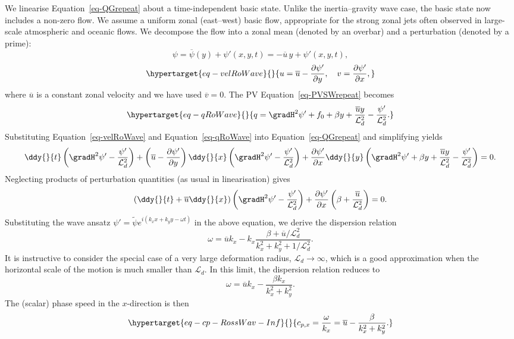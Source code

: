 \documentclass[
  letterpaper,
  twocolumn,
  landscape]{report}
\begin{document}
We linearise Equation~\ref{eq-QGrepeat} about a time-independent basic
state. Unlike the inertia--gravity wave case, the basic state now
includes a non-zero flow. We assume a uniform zonal (east--west) basic
flow, appropriate for the strong zonal jets often observed in
large-scale atmospheric and oceanic flows. We decompose the flow into a
zonal mean (denoted by an overbar) and a perturbation (denoted by a
prime): \[
    \psi = \overline{\psi}(y) + \psi'(x,y,t) = - \overline{u}\, y + \psi'(x,y,t),
\] \begin{equation}\protect\hypertarget{eq-velRoWave}{}{
    u = \overline{u} - \frac{\partial \psi'}{\partial y}, \quad v = \frac{\partial \psi'}{\partial x},
}\label{eq-velRoWave}\end{equation} where \(\overline{u}\) is a constant
zonal velocity and we have used \(\overline{v} = 0\). The PV
Equation~\ref{eq-PVSWrepeat} becomes
\begin{equation}\protect\hypertarget{eq-qRoWave}{}{
    q = \gradH^2 \psi' + f_0 + \beta y + \frac{\overline{u} y}{\mathcal{L}_d^2} -\frac{\psi'}{\mathcal{L}_d^2}.
}\label{eq-qRoWave}\end{equation} Substituting
Equation~\ref{eq-velRoWave} and Equation~\ref{eq-qRoWave} into
Equation~\ref{eq-QGrepeat} and simplifying yields \[
    \ddy{}{t}\left( \gradH^2 \psi' -\frac{\psi'}{\mathcal{L}_d^2} \right) 
    + \left( \overline{u} - \frac{\partial \psi'}{\partial y} \right) \ddy{}{x} \left( \gradH^2 \psi' -\frac{\psi'}{\mathcal{L}_d^2} \right) +
    \frac{\partial \psi'}{\partial x} \ddy{}{y} \left( \gradH^2 \psi' + \beta y + \frac{\overline{u} y}{\mathcal{L}_d^2} -\frac{\psi'}{\mathcal{L}_d^2} \right) = 0.
\] Neglecting products of perturbation quantities (as usual in
linearisation) gives \[
   \left(\ddy{}{t} + \overline{u} \ddy{}{x}\right) \left( \gradH^2 \psi' -\frac{\psi'}{\mathcal{L}_d^2} \right) 
   + \frac{\partial \psi'}{\partial x} \left( \beta + \frac{\overline{u}}{\mathcal{L}_d^2} \right) = 0.
\] Substituting the wave ansatz
\(\psi' = \tilde{\psi} e^{i ( k_x x + k_y y - \omega t)}\) in the above
equation, we derive the dispersion relation \[
    \omega = \overline{u} k_x - k_x \frac{\beta + \overline{u}/\mathcal{L}_d^2}{k_x^2+k_y^2+1/\mathcal{L}_d^2}.
\] It is instructive to consider the special case of a very large
deformation radius, \(\mathcal{L}_d \to \infty\), which is a good
approximation when the horizontal scale of the motion is much smaller
than \(\mathcal{L}_d\). In this limit, the dispersion relation reduces
to \[
    \omega = \overline{u} k_x - \frac{\beta k_x }{k_x^2+k_y^2}.
\] The (scalar) phase speed in the \(x\)-direction is then
\begin{equation}\protect\hypertarget{eq-cp-RossWav-Inf}{}{
    c_{p,x} = \frac{\omega}{k_x} = \overline{u} - \frac{\beta}{k_x^2+k_y^2}.
}\label{eq-cp-RossWav-Inf}\end{equation}
\end{document}
